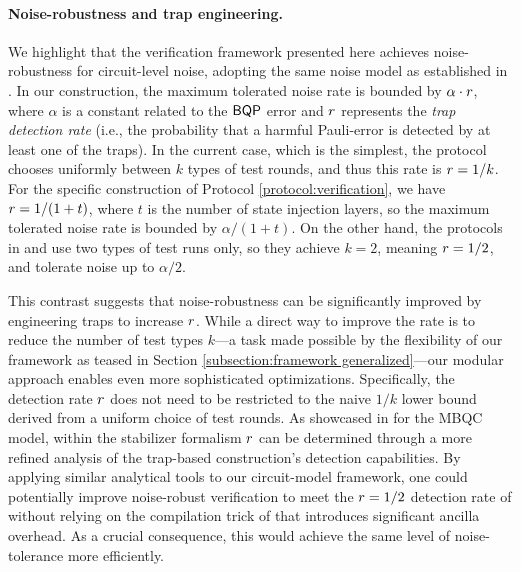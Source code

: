 \paragraph{Noise-robustness and trap engineering.}
We highlight that the verification framework presented here achieves noise-robustness for circuit-level noise, adopting the same noise model as established in \cite{LMKO21verifying, BN25noise}. In our construction, the maximum tolerated noise rate is bounded by $\alpha \cdot r$, where $\alpha$ is a constant related to the $\textsf{BQP}$ error and $r$ represents the \textit{trap detection rate} (i.e., the probability that a harmful Pauli-error is detected by at least one of the traps). In the current case, which is the simplest, the protocol chooses uniformly between $k$ types of test rounds, and thus this rate is $r = 1/k$. For the specific construction of Protocol \ref{protocol:verification}, we have $r = 1/(1+t)$, where $t$ is the number of state injection layers, so the maximum tolerated noise rate is bounded by $\alpha/(1+t)$. On the other hand, the protocols in \cite{BN25noise} and \cite{LMKO21verifying} use two types of test runs only, so they achieve $k=2$, meaning $r=1/2$, and tolerate noise up to $\alpha/2$.

This contrast suggests that noise-robustness can be significantly improved by engineering traps to increase $r$. While a direct way to improve the rate is to reduce the number of test types $k$---a task made possible by the flexibility of our framework as teased in Section \ref{subsection:framework generalized}---our modular approach enables even more sophisticated optimizations.
Specifically, the detection rate $r$ does not need to be restricted to the naive $1/k$ lower bound derived from a uniform choice of test rounds. As showcased in \cite{KKLM22unifying} for the MBQC model, within the stabilizer formalism $r$ can be determined through a more refined analysis of the trap-based construction's detection capabilities. By applying similar analytical tools to our circuit-model framework, one could potentially improve noise-robust verification to meet the $r=1/2$ detection rate of \cite{BN25noise} without relying on the compilation trick of \cite{B18how} that introduces significant ancilla overhead. As a crucial consequence, this would achieve the same level of noise-tolerance more efficiently.

